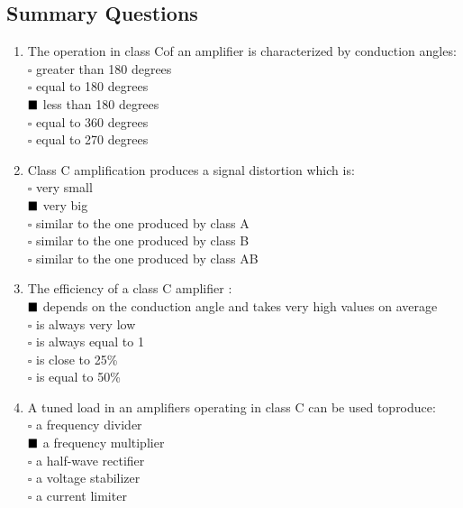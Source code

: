 \documentclass[12pt,a4paper]{article}
\begin{document}
    \subsection{Summary Questions}
    \begin{enumerate}
        \item The operation in class Cof an amplifier is characterized by conduction angles:\\
        
    \(\square\) greater than 180 degrees\\
    \(\square\) equal to 180 degrees\\
    \(\textcolor{black}{\blacksquare}\) less than 180 degrees\\
    \(\square\) equal to 360 degrees\\
    \(\square\) equal to 270 degrees

    \item Class C amplification produces a signal distortion which is:\\
    \(\square\) very small\\
    \(\textcolor{black}{\blacksquare}\) very big\\
    \(\square\) similar to the one produced by class A\\
    \(\square\) similar to the one produced by class B\\
    \(\square\) similar to the one produced by class AB

    \item The efficiency of a class C amplifier :\\
    \(\textcolor{black}{\blacksquare}\) depends on the conduction angle and takes very high values on average\\
    \(\square\) is always very low\\
    \(\square\) is always equal to 1\\
    \(\square\) is close to 25\% \\
    \(\square\) is equal to 50\% \\

    \item A tuned load in an amplifiers operating in class C can be used toproduce:\\

    \(\square\) a frequency divider\\
    \(\textcolor{black}{\blacksquare}\) a frequency multiplier\\
    \(\square\) a half-wave rectifier\\
    \(\square\) a voltage stabilizer\\
    \(\square\) a current limiter
    \end{enumerate}
\end{document}
